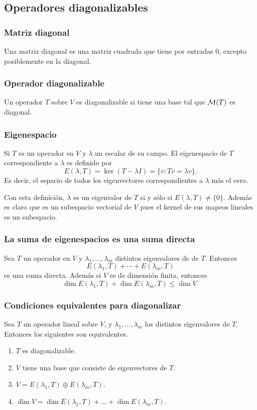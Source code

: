 \documentclass{article}
\begin{document}
\subsection{Operadores diagonalizables}
\subsubsection{Matriz diagonal}
Una matriz diagonal es una matriz cuadrada que tiene por
entradas $0$, excepto posiblemente en la diagonal.

\subsubsection{Operador diagonalizable}
Un operador $T$ sobre $V$ es diagonalizable si tiene
una base tal que $\mathcal{M}(T)$ es diagonal.

\subsubsection{Eigenespacio}
Si $T$ es un operador en $V$ y $\lambda$ un escalar de su campo.
El eigenespacio de $T$ correspondiente a $\lambda$ es
definido por 
$$E(\lambda, T)=\ker(T-\lambda I)=\{v:Tv=\lambda v\}.$$
Es decir, el espacio de todos los eigenvectores correspondientes
a $\lambda$ más el cero.

Con esta definición, $\lambda$ es un eigenvalor de $T$
si y sólo si $E(\lambda, T)\neq \{0\}$. Además es claro que es
un subespacio vectorial de $V$ pues el kernel de sus
mapeos lineales es un subespacio.

\subsubsection{La suma de eigenespacios es una suma directa}
Sea $T$ un operador en $V$ y $\lambda_1,\ldots,\lambda_m$ 
distintos eigenvalores de de $T$. Entonces
$$E(\lambda_1, T)+\cdots+E(\lambda_m, T)$$
es una suma directa.
Además si $V$ es de dimensión finita, entonces
$$\dim E(\lambda_1, T)+\dim E(\lambda_m, T) \leq \dim V.$$

\subsubsection{Condiciones equivalentes para diagonalizar}
Sea $T$ un operador lineal sobre $V$, y
$\lambda_1,\ldots,\lambda_m$ los distintos eigenvalores de
$T$. Entonces los siguientes son equivalentes.
\begin{enumerate}
    \item $T$ es diagonalizable.
    \item $V$ tiene una base que consiste de eigenvectores de
    $T$.
    \item $V=E(\lambda_1, T)\oplus E(\lambda_m, T)$.
    \item $\dim V =
    \dim E(\lambda_1, T)+\ldots+\dim E(\lambda_m, T)$.
\end{enumerate}
\end{document}
